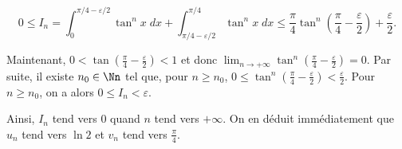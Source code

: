 {\begin{enumerate}
{$$0\leq I_n=\int_{0}^{\pi/4-\varepsilon/2}\tan^nx\;dx+\int_{\pi/4-\varepsilon/2}^{\pi/4}\tan^nx\;dx\leq\frac{\pi}{4}\tan^n(\frac{\pi}{4}-\frac{\varepsilon}{2})+\frac{\varepsilon}{2}.$$

Maintenant, $0<\tan(\frac{\pi}{4}-\frac{\varepsilon}{2})<1$ et donc $\lim_{n\rightarrow +\infty}\tan^n(\frac{\pi}{4}-\frac{\varepsilon}{2})=0$. Par suite, il existe $n_0\in\Nn$ tel que, pour $n\geq n_0$, $0\leq\tan^n(\frac{\pi}{4}-\frac{\varepsilon}{2})<\frac{\varepsilon}{2}$. Pour $n\geq n_0$, on a alors $0\leq I_n<\varepsilon$.

Ainsi, $I_n$ tend vers $0$ quand $n$ tend vers $+\infty$. On en déduit immédiatement que $u_n$ tend vers $\ln2$ et $v_n$ tend vers $\frac{\pi}{4}$.}
\end{enumerate}
}

